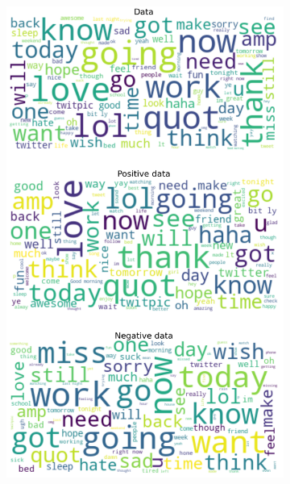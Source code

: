 \documentclass{article}
\begin{document}
\begin{itemize}
  \begin{figure}[H]
    \centering
    \captionsetup{justification=centering}
    \begin{subfigure}[b]{0.24\textwidth}
      \centering
      \includegraphics[width=\textwidth]{chapter-06/section-01-01/08/visualization/1/wordcloud.png}
    \end{subfigure}
    \begin{subfigure}[b]{0.24\textwidth}
      \centering

\end{subfigure}
\end{figure}
\end{itemize}
\end{document}
